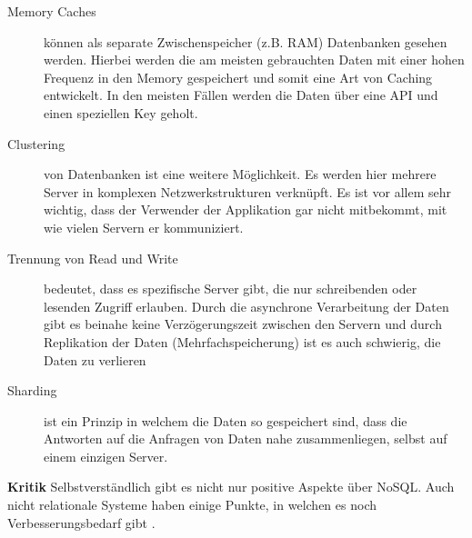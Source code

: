 \begin{description}
	\item[Memory Caches] können als separate Zwischenspeicher (z.B. RAM) Datenbanken gesehen werden. Hierbei werden die am meisten gebrauchten Daten mit einer hohen Frequenz in den Memory gespeichert und somit eine Art von Caching entwickelt. In den meisten Fällen werden die Daten über eine API und einen speziellen Key geholt.

	\item[Clustering] von Datenbanken ist eine weitere Möglichkeit. Es werden hier mehrere Server in komplexen Netzwerkstrukturen verknüpft. Es ist vor allem sehr wichtig, dass der Verwender der Applikation gar nicht mitbekommt, mit wie vielen Servern er kommuniziert.

	\item[Trennung von Read und Write] bedeutet, dass es spezifische Server gibt, die nur schreibenden oder lesenden Zugriff erlauben. Durch die asynchrone Verarbeitung der Daten gibt es beinahe keine Verzögerungszeit zwischen den Servern und durch Replikation der Daten (Mehrfachspeicherung) ist es auch schwierig, die Daten zu verlieren

	\item[Sharding] ist ein Prinzip in welchem die Daten so gespeichert sind, dass die Antworten auf die Anfragen von Daten nahe zusammenliegen, selbst auf einem einzigen Server.
\end{description}

\textbf{Kritik\newline}
Selbstverständlich gibt es nicht nur positive Aspekte über NoSQL. Auch nicht relationale Systeme haben einige Punkte, in welchen es noch Verbesserungsbedarf gibt \cite{MELD.CH2-noSQL.sqlvsnosql}. 

